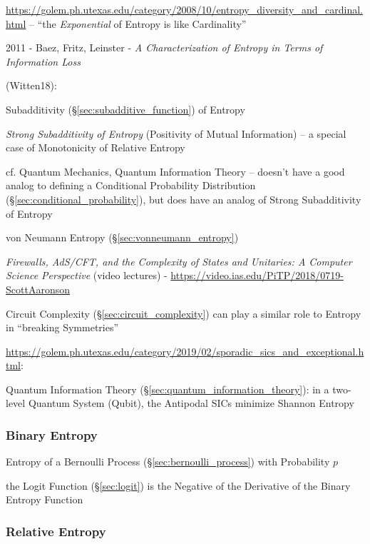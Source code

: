 \url{https://golem.ph.utexas.edu/category/2008/10/entropy_diversity_and_cardinal.html}
-- ``the \emph{Exponential} of Entropy is like Cardinality''

2011 - Baez, Fritz, Leinster - \emph{A Characterization of Entropy in Terms of
  Information Loss}

\asterism

(Witten18):

Subadditivity (\S\ref{sec:subadditive_function}) of Entropy

\emph{Strong Subadditivity of Entropy} (Positivity of Mutual Information) --
a special case of Monotonicity of Relative Entropy

cf. Quantum Mechanics, Quantum Information Theory
-- doesn't have a good analog to defining a Conditional Probability Distribution
(\S\ref{sec:conditional_probability}), but does have an analog of Strong
Subadditivity of Entropy

\fist von Neumann Entropy (\S\ref{sec:vonneumann_entropy})

\asterism

\emph{Firewalls, AdS/CFT, and the Complexity of States and Unitaries: A Computer
  Science Perspective}
(video lectures)
-
\url{https://video.ias.edu/PiTP/2018/0719-ScottAaronson}

Circuit Complexity (\S\ref{sec:circuit_complexity}) can play a similar role to
Entropy in ``breaking Symmetries''

\asterism

\url{https://golem.ph.utexas.edu/category/2019/02/sporadic_sics_and_exceptional.html}:

Quantum Information Theory (\S\ref{sec:quantum_information_theory}): in a
two-level Quantum System (Qubit), the Antipodal SICs minimize Shannon Entropy



\subsubsection{Binary Entropy}\label{sec:binary_entropy}

Entropy of a Bernoulli Process (\S\ref{sec:bernoulli_process}) with Probability
$p$

the Logit Function (\S\ref{sec:logit}) is the Negative of the Derivative of the
Binary Entropy Function



\subsubsection{Relative Entropy}\label{sec:relative_entropy}

